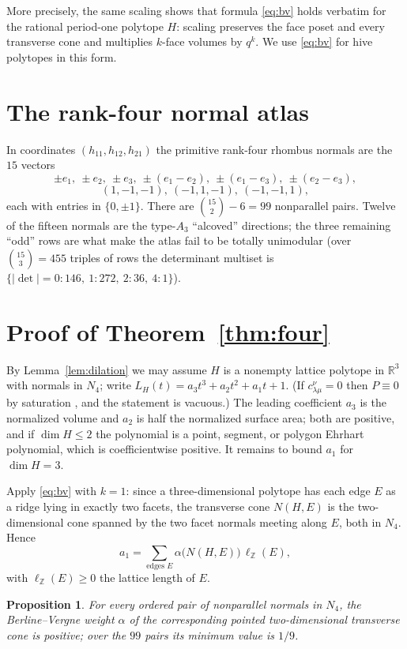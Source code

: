 \documentclass[11pt]{amsart}
\newtheorem{proposition}[theorem]{Proposition}
\theoremstyle{definition}
\newcommand{\Z}{\mathbb{Z}}
\newcommand{\R}{\mathbb{R}}
\newcommand{\lam}{\lambda}
\begin{document}
More precisely, the same scaling shows that formula \eqref{eq:bv} holds
verbatim for the rational period-one polytope $H$: scaling preserves the face
poset and every transverse cone and multiplies $k$-face volumes by $q^{k}$. We
use \eqref{eq:bv} for hive polytopes in this form.

\section{The rank-four normal atlas}\label{sec:rank4}

In coordinates $(h_{11},h_{12},h_{21})$ the primitive rank-four rhombus normals
are the $15$ vectors
\[
  \pm e_1,\ \pm e_2,\ \pm e_3,\ \pm(e_1-e_2),\ \pm(e_1-e_3),\ \pm(e_2-e_3),
\]
\[
  (1,-1,-1),\ (-1,1,-1),\ (-1,-1,1),
\]
each with entries in $\{0,\pm1\}$. There are $\binom{15}{2}-6=99$ nonparallel
pairs. Twelve of the fifteen normals are the type-$A_3$ ``alcoved'' directions;
the three remaining ``odd'' rows are what make the atlas fail to be totally
unimodular (over $\binom{15}{3}=455$ triples of rows the determinant multiset is
$\{|{\det}|{=}0{:}146,\ 1{:}272,\ 2{:}36,\ 4{:}1\}$).

\section{Proof of Theorem~\ref{thm:four}}\label{sec:proofmain}

By Lemma~\ref{lem:dilation} we may assume $H$ is a nonempty lattice polytope in
$\R^{3}$ with normals in $N_4$; write $L_H(t)=a_3t^3+a_2t^2+a_1t+1$. (If
$c^{\nu}_{\lam\mu}=0$ then $P\equiv 0$ by saturation \cite{KnutsonTao}, and the
statement is vacuous.) The leading coefficient $a_3$ is the normalized volume
and $a_2$ is half the normalized surface area; both are positive, and if
$\dim H\le 2$ the polynomial is a point, segment, or polygon Ehrhart polynomial,
which is coefficientwise positive. It remains to bound $a_1$ for
$\dim H=3$.

Apply \eqref{eq:bv} with $k=1$: since a three-dimensional polytope has each edge
$E$ as a ridge lying in exactly two facets, the transverse cone $N(H,E)$ is the
two-dimensional cone spanned by the two facet normals meeting along $E$, both in
$N_4$. Hence
\[
  a_1=\sum_{\text{edges }E}\alpha\bigl(N(H,E)\bigr)\,\ell_{\Z}(E),
\]
with $\ell_{\Z}(E)\ge 0$ the lattice length of $E$.

\begin{proposition}\label{prop:codim2}
For every ordered pair of nonparallel normals in $N_4$, the Berline--Vergne
weight $\alpha$ of the corresponding pointed two-dimensional transverse cone is
positive; over the $99$ pairs its minimum value is $1/9$.
\end{proposition}
\end{document}

